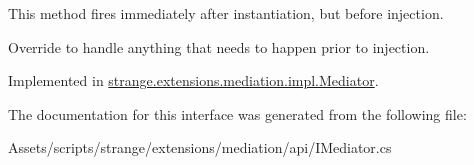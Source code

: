 This method fires immediately after instantiation, but before injection. 

Override to handle anything that needs to happen prior to injection. 

Implemented in \hyperlink{classstrange_1_1extensions_1_1mediation_1_1impl_1_1_mediator_a284db743d4cdf5d75d34fbad151eaf99}{strange.\-extensions.\-mediation.\-impl.\-Mediator}.



The documentation for this interface was generated from the following file\-:\begin{DoxyCompactItemize}
\item 
Assets/scripts/strange/extensions/mediation/api/I\-Mediator.\-cs\end{DoxyCompactItemize}
